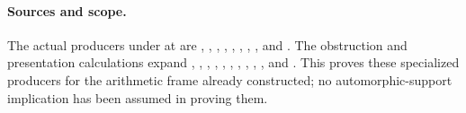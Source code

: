 \paragraph{Sources and scope.}
The actual producers under
at  are
,
, ,
, ,
, ,
, and .
The obstruction and presentation calculations
expand ,
, ,
, ,
, ,
,
, ,
and .
This proves these specialized producers for
the arithmetic frame already constructed;
no automorphic-support implication has been
assumed in proving them.
